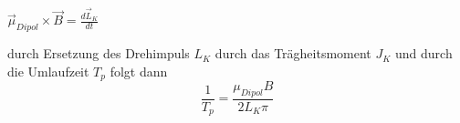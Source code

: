\begin{centering}

$\vec{\mu}_{Dipol} \times \vec{B}= \frac{d\vec{L}_{K}}{dt}$

\end{centering}

durch Ersetzung des Drehimpuls $L_{K}$ durch das Trägheitsmoment $J_{K}$ und durch die Umlaufzeit $T_{p}$ folgt dann 
\begin{equation}
    \frac{1}{T_{p}}= \frac{\mu_{Dipol} B}{2L_{K}\pi}
    \label{eqn:prz1}
\end{equation}







\label{sec:Theorie}

